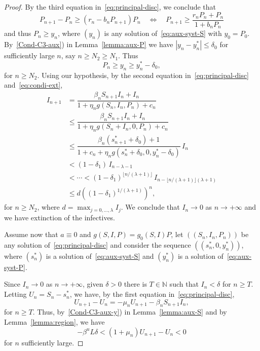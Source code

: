 \documentclass[reqno]{amsart}
\renewcommand{\le}{\leqslant}
\renewcommand{\ge}{\geqslant}
\newcommand{\N}{\ensuremath{\mathds N}}
\begin{document}
{{\begin{proof}
By the third equation in~\eqref{eq:principal-disc}, we conclude that
  $$P_{n+1}-P_n\ge (r_n-b_nP_{n+1})P_n \quad \Leftrightarrow \quad P_{n+1}\ge \frac{r_nP_n+P_n}{1+b_nP_n}$$
and thus $P_n\ge y_n$, where $(y_n)$ is any solution of~\eqref{eq:aux-syst-S} with $y_0=P_0$. By~\ref{Cond-C3-aux}) in Lemma~\ref{lemma:aux-P} we have $|y_n-y_n^*|\le \delta_0$ for sufficiently large $n$, say $n\ge N_2 \ge N_1$. Thus
$$P_n\ge y_n \ge y_n^*-\delta_0,$$
for $n\ge N_2$.
 Using our hypothesis, by the second equation in~\eqref{eq:principal-disc} and~\eqref{eq:condi-ext},
\[
\begin{split}
I_{n+1}
& =\dfrac{\beta_nS_{n+1}I_n+I_n}{1+\eta_ng(S_n,I_n,P_n)+c_n}\\
& \le\dfrac{\beta_nS_{n+1}I_n+I_n}{1+\eta_ng(S_n+I_n,0,P_n)+c_n}\\
& \le \dfrac{\beta_n(s^*_{n+1}+\delta_0)+1}{1+c_n+\eta_ng(s_n^*+\delta_0,0,y^*_n-\delta_0)}\, I_n\\
&<(1-\delta_1)\,I_{n-\lambda-1}\\
&<\cdots<(1-\delta_1)^{\lfloor n/(\lambda+1)\rfloor} \, I_{n-\lfloor n/(\lambda+1)\rfloor(\lambda+1)}\\
& \le d \left((1-\delta_1)^{1/(\lambda+1)}\right)^n,
\end{split}
\]
for $n \ge N_2$, where $\displaystyle d=\max_{j=0,\ldots,\lambda} I_j$. We conclude that $I_n\to 0$ as $n\to +\infty$ and we have extinction of the infectives.

Assume now that $a \equiv 0$ and $g(S,I,P)=g_0(S,I)P$, let $((S_n,I_n,P_n))$ be any solution of~\eqref{eq:principal-disc} and consider the sequence $((s^*_n,0,y_n^*))$, where $(s^*_n)$ is a solution of~\eqref{eq:aux-syst-S} and $(y^*_n)$ is a solution of~\eqref{eq:aux-syst-P}.

Since $I_n\to 0$ as $n \to +\infty$, given $\delta>0$ there is $T\in\N$ such that $I_n<\delta$ for $n \ge T$. Letting $U_n=S_n-s_n^*$, we have, by the first equation in~\eqref{eq:principal-disc},
 $$U_{n+1}-U_n=-\mu_n U_{n+1} -\beta_nS_{n+1}I_n,$$
for $n \ge T$. Thus, by~\ref{Cond-C3-aux-y}) in Lemma~\ref{lemma:aux-S} and by Lemma~\ref{lemma:region}, we have
 $$-\beta^u L \delta<(1+\mu_n)U_{n+1}-U_n < 0$$
for $n$ sufficiently large.


\end{proof}}}
\end{document}
